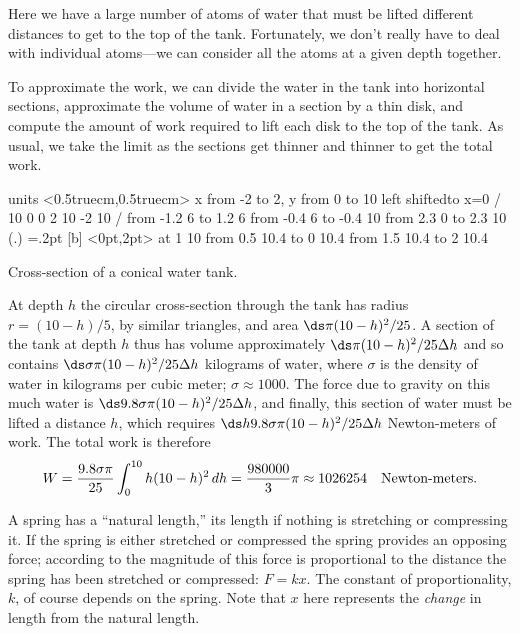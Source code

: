 \begin{solution}
Here we have a large number of
atoms of water that must be lifted different distances to get to the
top of the tank. Fortunately, we don't really have to deal with
individual atoms---we can consider all the atoms at a given depth
together. 

To approximate the work, we can divide the water in the tank into
horizontal sections, approximate the volume of water in a section by a
thin disk, and compute the amount of work required to lift each disk
to the top of the tank. As usual, we take the limit as the sections
get thinner and thinner to get the total work.

\figure[H]
\centerline{\vbox{\beginpicture
\normalgraphs
\setcoordinatesystem units <0.5truecm,0.5truecm>
\setplotarea x from -2 to 2, y from 0 to 10
\axis left shiftedto x=0 /
 10 0 0 2 10 -2 10 /
\setdashes
\putrule from -1.2 6 to 1.2 6
 from -0.4 6 to -0.4 10
 from 2.3 0 to 2.3 10
\setplotsymbol ({\small.})
\plotsymbolspacing=.2pt
 [b] <0pt,2pt> at 1 10
\arrow <2pt> [0.7, 2] from 0.5 10.4 to 0 10.4
\arrow <2pt> [0.7, 2] from 1.5 10.4 to 2 10.4
\endpicture}}
\caption{\label{fig:conical water tank}
Cross-section of a conical water tank.}
\endfigure

At depth $h$ the circular cross-section through the tank has radius
$r=(10-h)/5$, by similar triangles,
 and area $\ds \pi(10-h)^2/25$. A section of the tank at depth
$h$ thus has volume approximately $\ds \pi(10-h)^2/25\Delta h$ and so
contains $\ds \sigma\pi(10-h)^2/25\Delta h$ kilograms of water, where
$\sigma$ is the density of water in kilograms per cubic meter;
$\sigma\approx 1000$. The force due to gravity on this much water is
$\ds 9.8\sigma\pi(10-h)^2/25\Delta h$, and finally, this section of water
must be lifted a distance $h$, which requires
$\ds h9.8\sigma\pi(10-h)^2/25\Delta h$ Newton-meters of work. The total
work is therefore
$$W={9.8\sigma\pi\over 25} \int_0^{10} h(10-h)^2\,dh={980000\over3}\pi\approx
1026254\quad\hbox{Newton-meters.}$$
\end{solution}

A spring has a ``natural length,'' its length if nothing is stretching
or compressing it. If the spring is either stretched or compressed the
spring provides an opposing force; according to  
the magnitude of this force is proportional to the
distance the spring has been stretched or compressed: $F=kx$.
The constant of proportionality, $k$, of course depends on the
spring. Note that $x$ here represents the {\em change} in length from the
natural length.


